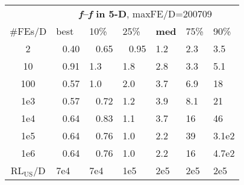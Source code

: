 \begin{tabular}{c|llllll}
 & \multicolumn{6}{|c}{\textbf{\textit{f}\raisebox{-0.35ex}{1}--\textit{f}\raisebox{-0.35ex}{24} in 5-D}, maxFE/D=200709}\\
\#FEs/D & best & 10\% & 25\% & \textbf{med} & 75\% & 90\%\\
2 & ~\,0.40 & ~\,0.65 & ~\,0.95 & \hspace*{1ex}1.2 & \hspace*{1ex}2.3 & \hspace*{1ex}3.5\\
10 & ~\,0.91 & \hspace*{1ex}1.3 & \hspace*{1ex}1.8 & \hspace*{1ex}2.8 & \hspace*{1ex}3.3 & \hspace*{1ex}5.1\\
100 & ~\,0.57 & \hspace*{1ex}1.0 & \hspace*{1ex}2.0 & \hspace*{1ex}3.7 & \hspace*{1ex}6.9 & 18\\
1e3 & ~\,0.57 & ~\,0.72 & \hspace*{1ex}1.2 & \hspace*{1ex}3.9 & \hspace*{1ex}8.1 & 21\\
1e4 & ~\,0.64 & ~\,0.83 & \hspace*{1ex}1.1 & \hspace*{1ex}3.7 & 16 & 46\\
1e5 & ~\,0.64 & ~\,0.76 & \hspace*{1ex}1.0 & \hspace*{1ex}2.2 & 39 & 3.1e2\\
1e6 & ~\,0.64 & ~\,0.76 & \hspace*{1ex}1.0 & \hspace*{1ex}2.2 & 16 & 4.7e2\\
$\text{RL}_{\text{US}}$/D & 7e4 & 7e4 & 1e5 & 2e5 & 2e5 & 2e5
\end{tabular}
